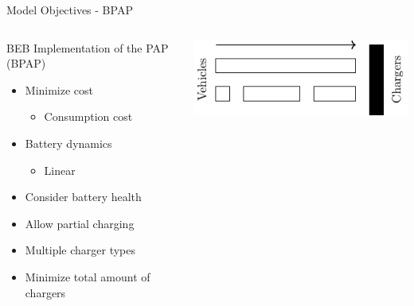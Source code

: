 \documentclass[aspectratio=169,dvipsnames]{beamer}
\begin{document}
\begin{frame}[label={sec:orgead7955}]{Model Objectives - BPAP}
\begin{columns}
\begin{column}{0.5\columnwidth}
\begin{block}{BEB Implementation of the PAP (BPAP)}
{\footnotesize
\begin{itemize}
\item Minimize cost
\begin{itemize}
\item Consumption cost
\end{itemize}
\item Battery dynamics
\begin{itemize}
\item Linear
\end{itemize}
\item Consider battery health
\item Allow partial charging
\item Multiple charger types
\item Minimize total amount of chargers
\end{itemize}
}
\end{block}
\end{column}

\begin{column}{0.5\columnwidth}
\begin{center}
\includegraphics[width=.9\linewidth]{./img/pap.pdf}
\end{center}
\end{column}
\end{columns}
\end{frame}
\end{document}
